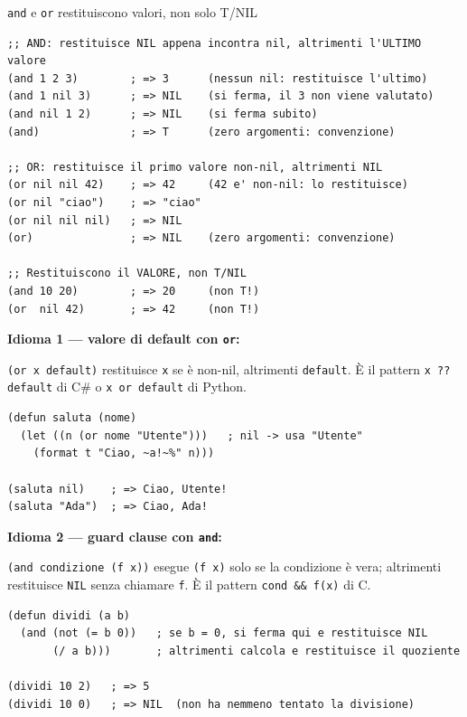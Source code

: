 \begin{concetto}{\texttt{and} e \texttt{or} restituiscono valori, non solo T/NIL}


\boxsep
{}
\end{concetto}

\begin{esempio}
\begin{lstlisting}
;; AND: restituisce NIL appena incontra nil, altrimenti l'ULTIMO valore
(and 1 2 3)        ; => 3      (nessun nil: restituisce l'ultimo)
(and 1 nil 3)      ; => NIL    (si ferma, il 3 non viene valutato)
(and nil 1 2)      ; => NIL    (si ferma subito)
(and)              ; => T      (zero argomenti: convenzione)

;; OR: restituisce il primo valore non-nil, altrimenti NIL
(or nil nil 42)    ; => 42     (42 e' non-nil: lo restituisce)
(or nil "ciao")    ; => "ciao"
(or nil nil nil)   ; => NIL
(or)               ; => NIL    (zero argomenti: convenzione)

;; Restituiscono il VALORE, non T/NIL
(and 10 20)        ; => 20     (non T!)
(or  nil 42)       ; => 42     (non T!)
\end{lstlisting}
\end{esempio}

\begin{confronto}
\textbf{Idioma 1 --- valore di default con \texttt{or}:}

\texttt{(or x default)} restituisce \texttt{x} se è non-nil,
altrimenti \texttt{default}. È il pattern \texttt{x ?? default}
di C\# o \texttt{x or default} di Python.

\begin{lstlisting}
(defun saluta (nome)
  (let ((n (or nome "Utente")))   ; nil -> usa "Utente"
    (format t "Ciao, ~a!~%" n)))

(saluta nil)    ; => Ciao, Utente!
(saluta "Ada")  ; => Ciao, Ada!
\end{lstlisting}

\medskip
\textbf{Idioma 2 --- guard clause con \texttt{and}:}

\texttt{(and condizione (f x))} esegue \texttt{(f x)} solo se
la condizione è vera; altrimenti restituisce \texttt{NIL}
senza chiamare \texttt{f}. È il pattern \texttt{cond \&\& f(x)} di C.

\begin{lstlisting}
(defun dividi (a b)
  (and (not (= b 0))   ; se b = 0, si ferma qui e restituisce NIL
       (/ a b)))       ; altrimenti calcola e restituisce il quoziente

(dividi 10 2)   ; => 5
(dividi 10 0)   ; => NIL  (non ha nemmeno tentato la divisione)
\end{lstlisting}
\end{confronto}

